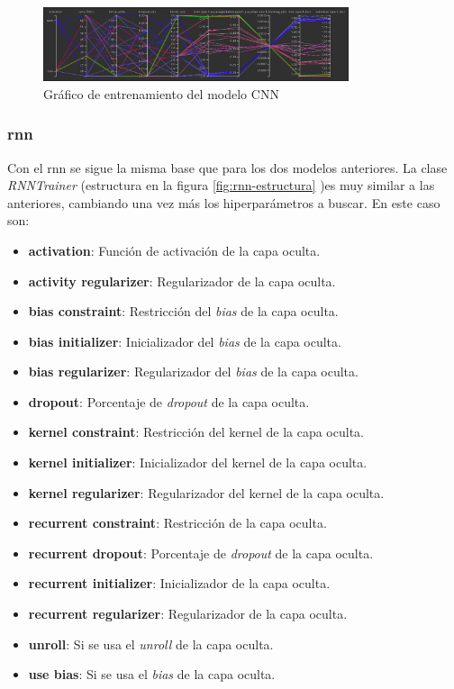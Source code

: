 \begin{figure}[H]
    \centering
    \includegraphics[width=0.8\textwidth]{Imagenes/Bitmap/tb-cnn-1.0.png}
    \caption{Gráfico de entrenamiento del modelo CNN}
    \label{fig:cnn-1.0-grafico-ejemplo}
\end{figure}

\subsubsection{\gls{rnn}}

Con el \gls{rnn} se sigue la misma base que para los dos modelos anteriores. La clase \textit{RNNTrainer} (estructura en la figura \ref{fig:rnn-estructura} )es muy similar a las anteriores, cambiando una vez más los hiperparámetros a buscar. En este caso son:

\begin{itemize}
    \item \textbf{activation}: Función de activación de la capa oculta.
    \item \textbf{activity regularizer}: Regularizador de la capa oculta.
    \item \textbf{bias constraint}: Restricción del \textit{bias} de la capa oculta.
    \item \textbf{bias initializer}: Inicializador del \textit{bias} de la capa oculta.
    \item \textbf{bias regularizer}: Regularizador del \textit{bias} de la capa oculta.
    \item \textbf{dropout}: Porcentaje de \textit{dropout} de la capa oculta.
    \item \textbf{kernel constraint}: Restricción del kernel de la capa oculta.
    \item \textbf{kernel initializer}: Inicializador del kernel de la capa oculta.
    \item \textbf{kernel regularizer}: Regularizador del kernel de la capa oculta.
    \item \textbf{recurrent constraint}: Restricción de la capa oculta.
    \item \textbf{recurrent dropout}: Porcentaje de \textit{dropout} de la capa oculta.
    \item \textbf{recurrent initializer}: Inicializador de la capa oculta.
    \item \textbf{recurrent regularizer}: Regularizador de la capa oculta.
    \item \textbf{unroll}: Si se usa el \textit{unroll} de la capa oculta.
    \item \textbf{use bias}: Si se usa el \textit{bias} de la capa oculta.
\end{itemize}

